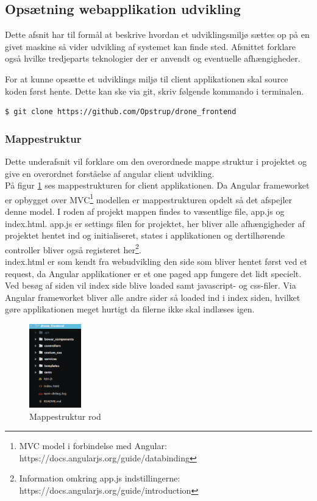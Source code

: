 \subsection{Opsætning webapplikation udvikling}
Dette afsnit har til formål at beskrive hvordan et udviklingsmiljø sættes op på en givet maskine så vider udvikling af systemet kan finde sted. Afsnittet forklare også hvilke tredjeparts teknologier der er anvendt og eventuelle afhængigheder.

For at kunne opsætte et udviklings miljø til client applikationen skal source koden først hente. Dette kan ske via git, skriv følgende kommando i terminalen.

\begin{lstlisting}[language=bash]
	$ git clone https://github.com/Opstrup/drone_frontend
\end{lstlisting}

\subsubsection*{Mappestruktur}
Dette underafsnit vil forklare om den overordnede mappe struktur i projektet og give en overordnet forståelse af angular client udvikling. \\

På figur \ref{fig:mappestruktur_client} ses mappestrukturen for client applikationen. Da Angular frameworket er opbygget over MVC\footnote{MVC model i forbindelse med Angular: https://docs.angularjs.org/guide/databinding} modellen er mappestrukturen opdelt så det afspejler denne model. I roden af projekt mappen findes to væsentlige file, app.js og index.html. app.js er settings filen for projektet, her bliver alle afhængigheder af projektet hentet ind og initialiseret, states i applikationen og dertilhørende controller bliver også registeret her\footnote{Information omkring app.js indstillingerne: https://docs.angularjs.org/guide/introduction}.\\
index.html er som kendt fra webudvikling den side som bliver hentet først ved et request, da Angular applikationer er et one paged app fungere det lidt specielt. Ved besøg af siden vil index side blive loaded samt javascript- og css-filer. Via Angular frameworket bliver alle andre sider så loaded ind i index siden, hvilket gøre applikationen meget hurtigt da filerne ikke skal indlæses igen.

\begin{figure}[H]
	\centering
	\includegraphics[width=0.2\textwidth]{Billeder/implementation/mappestruktur_client.png}
	\caption{Mappestruktur rod}
	\label{fig:mappestruktur_client}
\end{figure}

